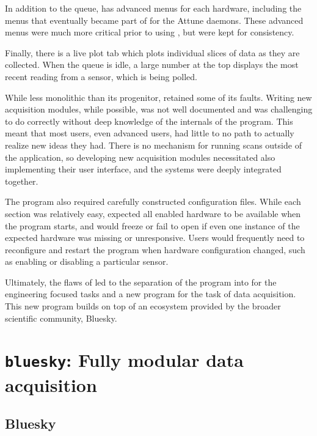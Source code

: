 In addition to the queue, \yaqccmds{} has advanced menus for each hardware, including the menus that eventually became part of \yaqcqtpy{} for the Attune daemons.
These advanced menus were much more critical prior to using \yaq{}, but were kept for consistency.

Finally, there is a live plot tab which plots individual slices of data as they are collected.
When the queue is idle, a large number at the top displays the most recent reading from a sensor, which is being polled.

While less monolithic than its progenitor, \yaqccmds{} retained some of its faults.
Writing new acquisition modules, while possible, was not well documented and was challenging to do correctly without deep knowledge of the internals of the program.
This meant that most users, even advanced users, had little to no path to actually realize new ideas they had.
There is no mechanism for running scans outside of the application, so developing new acquisition modules necessitated also implementing their user interface, and the systems were deeply integrated together.

The program also required carefully constructed configuration files.
While each section was relatively easy, \yaqccmds{} expected all enabled hardware to be available when the program starts, and would freeze or fail to open if even one instance of the expected hardware was missing or unresponsive.
Users would frequently need to reconfigure and restart the program when hardware configuration changed, such as enabling or disabling a particular sensor.

Ultimately, the flaws of \yaqccmds{} led to the separation of the program into \yaqcqtpy{} for the engineering focused tasks and a new program for the task of data acquisition.
This new program builds on top of an ecosystem provided by the broader scientific community, Bluesky\cite{AllanDanielB2019a}.

\clearpage

\section{\texttt{bluesky}: Fully modular data acquisition}

\subsection{Bluesky}

